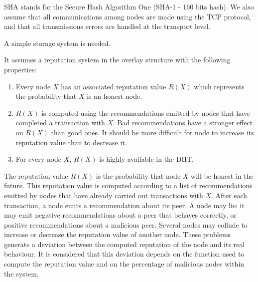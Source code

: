 SHA stands for the Secure Hash Algorithm One (SHA-1 - 160 bits hash). We also
assume that all communications among nodes are made using the TCP protocol, and
that all transmissions errors are handled at the transport level.

A simple storage system is needed.







It assumes a reputation system in the overlay structure with the following properties:
\begin{enumerate}
  \item Every node $X$ has an associated reputation value $R(X)$
  which represents the probability that $X$ is an honest node.
  \item $R(X)$ is computed using the recommendations emitted
  by nodes that have completed a transaction with $X$. Bad
  recommendations have a stronger effect on $R(X)$ than
  good ones. It should be more difficult for node to
  increase its reputation value than to decrease it.
  \item For every node $X$, $R(X)$ is highly available in the DHT.
\end{enumerate}

The reputation value $R(X)$ is the probability that node $X$ will
be honest in the future. This reputation value is computed
according to a list of recommendations emitted by nodes that
have already carried out transactions with $X$.
After each transaction, a node emits a recommendation
about its peer. A node may lie: it may emit negative
recommendations about a peer that behaves correctly, or
positive recommendations about a malicious peer. Several nodes
may collude to increase or decrease the reputation value of
another node. These problems generate a deviation between
the computed reputation of the node and its real behaviour. It is
considered that this deviation depends on the function used to
compute the reputation value and on the percentage of malicious
nodes within the system.

